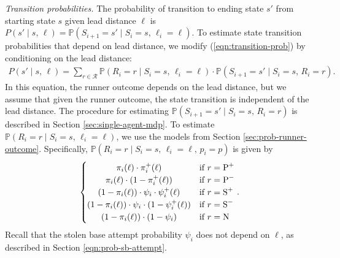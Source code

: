 \documentclass{article}
\begin{document}
        {\it Transition probabilities.} The probability of transition to ending state $s'$ from starting state $s$ given lead distance $\ell$ is $P(s' \mid s,\, \ell) = \mathbb{P}(S_{i+1} = s' \mid S_i = s,\, \ell_i = \ell)$. To estimate state transition probabilities that depend on lead distance, we modify (\ref{eqn:transition-prob}) by conditioning on the lead distance:
        \begin{align}
          \label{eqn:transition-prob-lead}
          P(s' \mid s,\, \ell) = \sum_{r \in \mathcal{R}} \mathbb{P}(R_i = r \mid S_i = s,\, \ell_i = \ell) \cdot \mathbb{P}(S_{i+1} = s' \mid S_i = s,\, R_i = r).
        \end{align}
        In this equation, the runner outcome depends on the lead distance, but we assume that given the runner outcome, the state transition is independent of the lead distance. The procedure for estimating $\mathbb{P}(S_{i+1} = s' \mid S_i = s,\, R_i = r)$ is described in Section \ref{sec:single-agent-mdp}. To estimate $\mathbb{P}(R_i = r \mid S_i = s,\, \ell_i = \ell)$, we use the models from Section \ref{sec:prob-runner-outcome}. Specifically, $\mathbb{P}(R_i = r \mid S_i = s,\, \ell_i = \ell,\, p_i = p)$ is given by
        \begin{align*}
          \begin{cases}
              \hfil \pi_i(\ell) \cdot \pi_i^+(\ell)                             & \mbox{if } r = \mbox{P}^+\\
              \hfil \pi_i(\ell) \cdot (1 - \pi_i^+(\ell))                       & \mbox{if } r = \mbox{P}^-\\
              \hfil (1 - \pi_i(\ell)) \cdot \psi_i \cdot \psi_i^+(\ell)         & \mbox{if } r = \mbox{S}^+\\
              \hfil (1 - \pi_i(\ell)) \cdot \psi_i \cdot (1 - \psi_i^+(\ell))   & \mbox{if } r = \mbox{S}^-\\
              \hfil (1 - \pi_i(\ell)) \cdot (1 - \psi_i)                        & \mbox{if } r = \mbox{N}\\
          \end{cases}.
        \end{align*}
        Recall that the stolen base attempt probability $\psi_i$ does not depend on $\ell$, as described in Section \ref{eqn:prob-sb-attempt}.
  
\end{document}
